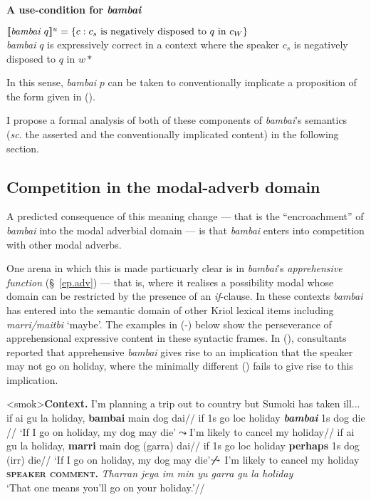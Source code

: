 \pex \textbf{A use-condition for \textit{bambai}}

$ \denote[u]{\textit{bambai }q}=\{c:c_s\text{ is negatively disposed to $ q $ in }c_W\} $\\
\textit{bambai} $ q$ is expressively correct in a context where the speaker $ c_s $ is negatively disposed to $ q $ in $ w* $
\xe


\noindent In this sense, \textit{bambai} $ p $ can be taken to conventionally implicate a proposition of the form given in (\lastx).





 I propose a formal analysis of both of these components of \textit{bambai}'s semantics (\textit{sc.} the asserted and the conventionally implicated content) in the following section.




\subsection{Competition in the modal-adverb domain}

A predicted consequence of this meaning change --- that is the ``encroachment'' of \textit{bambai} into the modal adverbial domain --- is that \textit{bambai} enters into competition with other modal adverbs. 

One arena in which this is made particuarly clear is in \textit{bambai}'s \textit{apprehensive function} (\S~\ref{ep.adv}) --- that is, where it realises a possibility modal whose domain can be restricted by the presence of an \textit{if}-clause. In these contexts \textit{bambai} has entered into the semantic domain of other Kriol lexical items including \textit{marri/maitbi} `maybe'.  The examples in (-) below show the perseverance of apprehensional expressive content in these syntactic frames. In (), consultants reported that apprehensive \textit{bambai} gives rise to an implication that the speaker may not go on holiday, where the minimally different () fails to give rise to this implication.

\pex<smok>\textbf{Context.} I'm planning a trip out to country but Sumoki has taken ill...
\a{}\begingl\gla if ai gu la holiday, \textbf{bambai} main dog dai//
\glb if 1s go {\sc loc} holiday \textit{\textbf{bambai}} 1s dog die //
\glft `If I go on holiday, my dog may die'\hfill$\boldsymbol\leadsto$\hfill I'm likely to cancel my holiday//
\endgl
\a{}\begingl
\gla if ai gu la holiday, \textbf{marri} main dog (garra) dai//
\glb if 1s go {\sc loc} holiday \textbf{perhaps} 1s dog {\sc(irr)} die//
\glft `If I go on holiday, my dog may die'\hfill$\boldsymbol{\not\leadsto}\hfill$ I'm likely to cancel my holiday\\[.2em]
\textsc{\textbf{speaker comment.}} \textit{Tharran jeya im min yu garra gu la holiday}\\`That one means you'll go on your holiday.'\trailingcitation{[AJ 04082017]}//
\endgl
\xe

